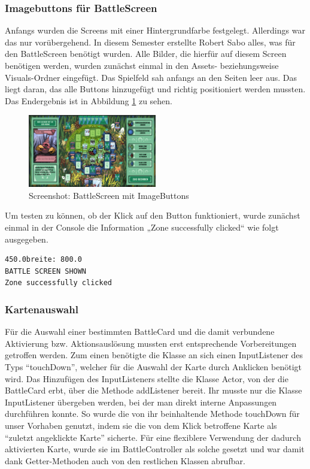 \subsubsection{Imagebuttons für BattleScreen}
Anfangs wurden die Screens mit einer Hintergrundfarbe festgelegt. 
Allerdings war das nur vorübergehend. In diesem Semester erstellte Robert Sabo alles, was für den BattleScreen benötigt wurden.
Alle Bilder, die hierfür auf diesem Screen benötigen werden, wurden zunächst einmal in den Assets- beziehungsweise Visuals-Ordner eingefügt. Das Spielfeld sah anfangs an den Seiten leer aus. Das liegt daran, das alle Buttons hinzugefügt und richtig positioniert werden mussten. Das Endergebnis ist in Abbildung \ref{fig:Screenshot: BattleScreen mit ImageButtons} zu sehen.
\begin{figure}
\includegraphics[width=0.5\textwidth]{../img/screenshot_battlescreen_buttons.PNG}
\caption{Screenshot: BattleScreen mit ImageButtons}
\label{fig:Screenshot: BattleScreen mit ImageButtons}
\end{figure}
Um testen zu können, ob der Klick auf den Button funktioniert, wurde zunächst einmal in der Console die Information „Zone successfully clicked“ wie folgt ausgegeben. \\
\begin{lstlisting}
450.0breite: 800.0
BATTLE SCREEN SHOWN
Zone successfully clicked
\end{lstlisting}

\subsubsection{Kartenauswahl}
Für die Auswahl einer bestimmten BattleCard und die damit verbundene Aktivierung bzw. Aktionsauslösung mussten erst entsprechende Vorbereitungen getroffen werden.
Zum einen benötigte die Klasse an sich einen InputListener des Typs “touchDown”, welcher für die Auswahl der Karte durch Anklicken benötigt wird. Das Hinzufügen des InputListeners stellte die Klasse Actor, von der die BattleCard erbt, über die Methode addListener bereit. Ihr musste nur die Klasse InputListener übergeben werden, bei der man direkt interne Anpassungen durchführen konnte. So wurde die von ihr beinhaltende Methode touchDown für unser Vorhaben genutzt, indem sie die von dem Klick betroffene Karte als “zuletzt angeklickte Karte” sicherte. Für eine flexiblere Verwendung der dadurch aktivierten Karte, wurde sie im BattleController als solche gesetzt und war damit dank Getter-Methoden auch von den restlichen Klassen abrufbar.

